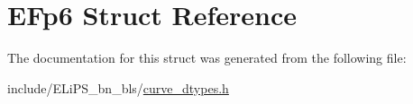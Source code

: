 \hypertarget{struct_e_fp6}{}\section{E\+Fp6 Struct Reference}
\label{struct_e_fp6}


The documentation for this struct was generated from the following file\+:\begin{DoxyCompactItemize}
\item 
include/\+E\+Li\+P\+S\+\_\+bn\+\_\+bls/\hyperlink{curve__dtypes_8h}{curve\+\_\+dtypes.\+h}\end{DoxyCompactItemize}
